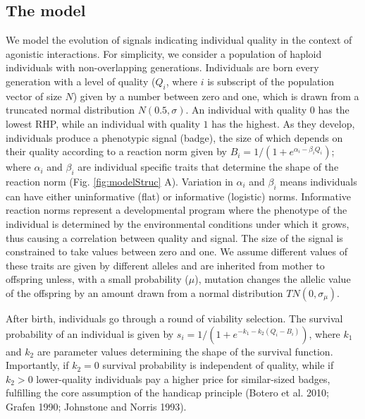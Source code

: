 \documentclass[
  12pt,
]{article}
\begin{document}
\hypertarget{the-model}{%
\subsection{The model}\label{the-model}}

We model the evolution of signals indicating individual quality in the
context of agonistic interactions. For simplicity, we consider a
population of haploid individuals with non-overlapping generations.
Individuals are born every generation with a level of quality (\(Q_i\),
where \(i\) is subscript of the population vector of size \(N\)) given
by a number between zero and one, which is drawn from a truncated normal
distribution \(N( 0.5,\sigma)\). An individual with quality \(0\) has
the lowest RHP, while an individual with quality \(1\) has the highest.
As they develop, individuals produce a phenotypic signal (badge), the
size of which depends on their quality according to a reaction norm
given by \(B_i=1/(1+e^{\alpha_i-\beta_i Q_i})\); where \(\alpha_i\) and
\(\beta_i\) are individual specific traits that determine the shape of
the reaction norm (Fig. \ref{fig:modelStruc} A). Variation in
\(\alpha_i\) and \(\beta_i\) means individuals can have either
uninformative (flat) or informative (logistic) norms. Informative
reaction norms represent a developmental program where the phenotype of
the individual is determined by the environmental conditions under which
it grows, thus causing a correlation between quality and signal. The
size of the signal is constrained to take values between zero and one.
We assume different values of these traits are given by different
alleles and are inherited from mother to offspring unless, with a small
probability (\(\mu\)), mutation changes the allelic value of the
offspring by an amount drawn from a normal distribution
\(TN(0,\sigma_\mu)\).

After birth, individuals go through a round of viability selection. The
survival probability of an individual is given by
\(s_i=1/(1+e^{-k_1-k_2(Q_i-B_i)})\), where \(k_1\) and \(k_2\) are
parameter values determining the shape of the survival function.
Importantly, if \(k_2=0\) survival probability is independent of
quality, while if \(k_2>0\) lower-quality individuals pay a higher price
for similar-sized badges, fulfilling the core assumption of the handicap
principle (Botero et al. 2010; Grafen 1990; Johnstone and Norris 1993).
\end{document}
